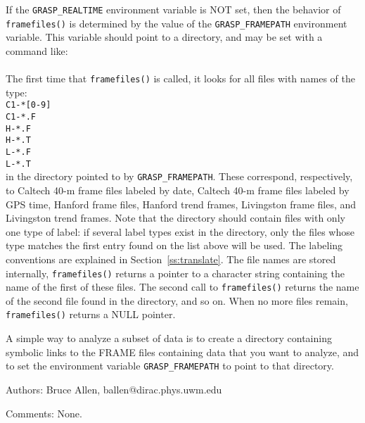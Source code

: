If the {\tt GRASP\_REALTIME} environment variable is NOT set, then the
behavior of {\tt framefiles()} is determined by the value of the {\tt GRASP\_FRAMEPATH}
environment variable.  This variable should point to a directory, and may be set with
a command like:\\
\\
The first time that {\tt framefiles()} is called, it looks for all
files with names of the type:\\
{\tt C1-*[0-9]}\\
{\tt C1-*.F}\\
{\tt H-*.F}\\
{\tt H-*.T}\\
{\tt L-*.F}\\
{\tt L-*.T}\\
in the directory pointed to by {\tt GRASP\_FRAMEPATH}.  These
correspond, respectively, to Caltech 40-m frame files labeled by date,
Caltech 40-m frame files labeled by GPS time, Hanford frame files,
Hanford trend frames, Livingston frame files, and Livingston trend
frames.  Note that the directory should contain files with only one
type of label:  if several label types exist in the directory, only the
files whose type matches the first entry found on the list above will
be used.   The labeling conventions are explained in
Section~\ref{ss:translate}.
The file names are stored internally, {\tt framefiles()} returns a pointer to 
a character string containing the name of the first of these files.  The
second call to {\tt framefiles()} returns the name of the second file found in the
directory, and so on.  When no more files remain, {\tt framefiles()} returns a NULL
pointer.

A simple way to analyze a subset of data is to create a directory
containing symbolic links to the FRAME files containing data that you want
to analyze, and to set the environment variable {\tt GRASP\_FRAMEPATH}
to point to that directory.

\begin{description}
\item{Authors:}
Bruce Allen, ballen@dirac.phys.uwm.edu
\item{Comments:}
None.
\end{description}
\clearpage




